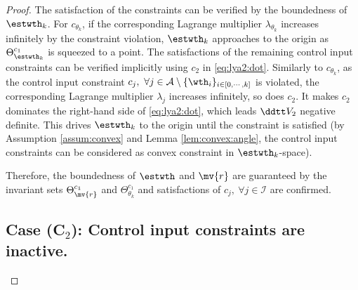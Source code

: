 \documentclass[lettersize,journal]{IEEEtran}
\newcommand*{\fe}{\mv{r}}
\begin{document}
\begin{proof}
The satisfaction of the constraints can be verified by the boundedness of $\estwth_k$.
For $c_{\theta_k}$, if the corresponding Lagrange multiplier $\lambda_{\theta_k}$ increases infinitely by the constraint violation, $\estwth_k$ approaches to the origin as $\Theta_{\estwth_k}^{c_1}$ is squeezed to a point.
The satisfactions of the remaining control input constraints can be verified implicitly using $c_2$ in \eqref{eq:lya2:dot}.
Similarly to $c_{\theta_k}$, as the control input constraint $c_j,\ \forall j\in\mathcal{A}\setminus \{\wth_i\}_{i\in[0,\cdots,k]}$ is violated, the corresponding Lagrange multiplier $\lambda_j$ increases infinitely, so does $c_2$.
It makes $c_2$ dominates the right-hand side of \eqref{eq:lya2:dot}, which leads $\ddtt V_2$ negative definite.
This drives $\estwth_k$ to the origin until the constraint is satisfied (\ie by Assumption \ref{assum:convex} and Lemma \ref{lem:convex:angle}, the control input constraints can be considered as convex constraint in $\estwth_k$-space).

Therefore, the boundedness of $\estwth$ and $\fe$ are guaranteed by the invariant sets $\Theta_{\fe}^{c_1}$ and $\Theta_{\theta_k}^{c_1}$ and satisfactions of $c_j,\ \forall j\in\mathcal{I}$ are confirmed.

\subsection*{Case (C$_2$): Control input constraints are inactive.}


\end{proof}
\end{document}
